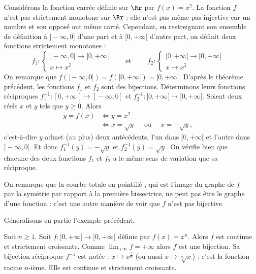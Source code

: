 \documentclass[class=report,crop=false]{standalone}
\begin{document}
\begin{exemple}
Considérons la fonction carrée définie sur $\Rr$ par $f(x)=x^2$. La fonction $f$ n'est
pas strictement monotone sur $\Rr$ :
elle n'est pas même pas injective car un nombre et son opposé ont même carré.
Cependant, en restreignant son ensemble de définition à $]-\infty,0]$ d'une part et à
$[0,+\infty[$ d'autre part, on définit deux fonctions strictement monotones
:
\[
f_1 :
\left\{\begin{array}{c}
]-\infty,0] \longrightarrow [0,+\infty[ \\
x \longmapsto x^2
\end{array}\right.
\qquad \text{et } \qquad
f_2 :
\left\{\begin{array}{c}
[0,+\infty[ \longrightarrow [0,+\infty[ \\
x \longmapsto x^2
\end{array}\right.
\]
On remarque que $f(]-\infty,0]) = f([0,+\infty[) = [0,+\infty[$. D'après le théorème précédent,
les fonctions $f_1$ et $f_2$ sont des bijections. Déterminons leurs fonctions réciproques
$f_1^{-1} :[0,+\infty[ \to]-\infty,0] $ et $f_2^{-1} :[0,+\infty[ \to [0,+\infty[$.
Soient deux réels $x$ et $y$ tels que $y\geq 0$. Alors
\begin{align*}
y=f(x) & \Leftrightarrow y=x^2\\
& \Leftrightarrow x=\sqrt{y} \quad \text{ ou } \quad x=-\sqrt{y},
\end{align*}
c'est-à-dire $y$ admet (au plus) deux antécédents, l'un dans $[0,+\infty[$ et l'autre dans $]-\infty,0] $.
Et donc $f_1^{-1}(y)=-\sqrt{y}$ et $f_2^{-1}(y)=\sqrt{y}$. On %
vérifie bien que chacune
des deux fonctions $f_1$ et $f_2$ a le même sens de variation que sa réciproque.



On remarque que la courbe totale en pointillé , qui est l'image du graphe de $f$ par la symétrie
par rapport à la première bissectrice, ne peut pas être le graphe d'une fonction :
c'est une autre manière de voir que $f$ n'est pas bijective.
\end{exemple}

Généralisons en partie l'exemple précédent.
\begin{exemple}
Soit $n\ge 1$. Soit $f : [0,+\infty[ \to [0,+\infty[$ définie par $f(x)=x^n$.
Alors $f$ est continue et strictement croissante. Comme
$\lim_{+\infty} f = +\infty$ alors $f$ est une bijection.
Sa bijection réciproque $f^{-1}$ est notée : $x \mapsto x^{\frac{1}{n}}$
(ou aussi $x \mapsto \sqrt[n]{x}$) : c'est la fonction racine $n$-ième.
Elle est continue et strictement croissante.
\end{exemple}
\end{document}
